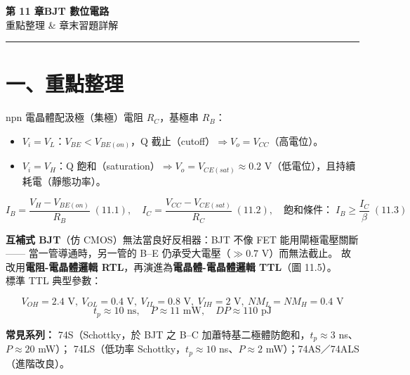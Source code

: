 \documentclass[12pt]{article}
\begin{document}
\begin{center}
{\Huge\bfseries\color{maincol} 第 11 章\quad BJT 數位電路}\\[0.4em]
{\large\color{keycol} 重點整理 \;\&\; 章末習題詳解}
\end{center}
\vspace{0.4em}\hrule\vspace{1em}

\section*{一、重點整理}

\begin{keybox}
npn 電晶體配汲極（集極）電阻 $R_C$，基極串 $R_B$：
\begin{itemize}[leftmargin=2.2em,itemsep=1pt]
  \item $V_i=V_L$：$V_{BE}<V_{BE(on)}$，Q 截止（cutoff）$\Rightarrow V_o=V_{CC}$（高電位）。
  \item $V_i=V_H$：Q 飽和（saturation）$\Rightarrow V_o=V_{CE(sat)}\approx0.2$ V（低電位），且持續耗電（靜態功率）。
\end{itemize}
\begin{formulabox}
\[ I_B=\frac{V_H-V_{BE(on)}}{R_B}\;(11.1),\quad
   I_C=\frac{V_{CC}-V_{CE(sat)}}{R_C}\;(11.2),\quad
   \text{飽和條件：}\;I_B\ge\frac{I_C}{\beta}\;(11.3) \]
\end{formulabox}
\end{keybox}

\begin{keybox}[11.2\ \ TTL 電路]
\textbf{互補式 BJT}（仿 CMOS）無法當良好反相器：BJT 不像 FET 能用閘極電壓關斷——
當一管導通時，另一管的 B--E 仍承受大電壓（$\gg0.7$ V）而無法截止。
故改用\textbf{電阻-電晶體邏輯 RTL}，再演進為\textbf{電晶體-電晶體邏輯 TTL}（圖 11.5）。\\
標準 TTL 典型參數：
\begin{formulabox}
\[ V_{OH}=2.4\text{ V},\ V_{OL}=0.4\text{ V},\ V_{IL}=0.8\text{ V},\ V_{IH}=2\text{ V},\
   NM_L=NM_H=0.4\text{ V} \]
\[ t_p\approx10\text{ ns},\quad P\approx11\text{ mW},\quad DP\approx110\text{ pJ} \]
\end{formulabox}
\textbf{常見系列：} 74S（Schottky，於 BJT 之 B--C 加蕭特基二極體防飽和，$t_p\!\approx\!3$ ns、$P\!\approx\!20$ mW）；
74LS（低功率 Schottky，$t_p\!\approx\!10$ ns、$P\!\approx\!2$ mW）；74AS／74ALS（進階改良）。
\end{keybox}
\end{document}
